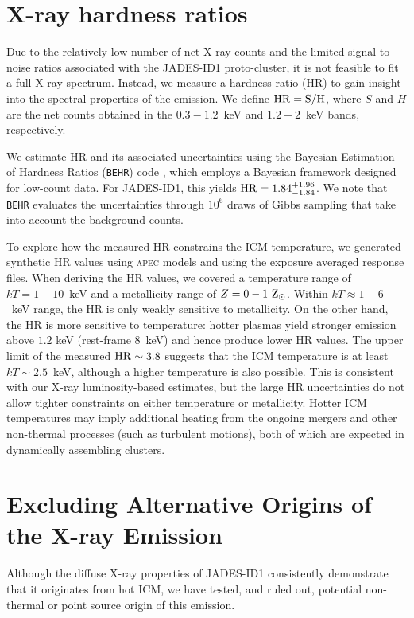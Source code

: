 \documentclass[pdflatex,sn-mathphys-num]{sn-jnl}
\theoremstyle{thmstyleone}
\theoremstyle{thmstyletwo}
\theoremstyle{thmstylethree}
\begin{document}
\section{X-ray hardness ratios}
\label{sec:hardness}

Due to the relatively low number of net X-ray counts and the limited signal-to-noise ratios associated with the JADES-ID1 proto-cluster, it is not feasible to fit a full X-ray spectrum. Instead, we measure a hardness ratio (HR) to gain insight into the spectral properties of the emission. We define $\rm{HR} = S/H$, where $S$ and $H$ are the net counts obtained in the $0.3-1.2$~keV and $1.2-2$~keV bands, respectively.

We estimate HR and its associated uncertainties using the Bayesian Estimation of Hardness Ratios (\texttt{BEHR}) code \cite{2006ApJ...652..610P}, which employs a Bayesian framework designed for low-count data. For JADES-ID1, this yields $\rm{HR}=1.84^{+1.96}_{-1.84}$. We note that \texttt{BEHR} evaluates the uncertainties through $10^6$ draws of Gibbs sampling that take into account the background counts.

To explore how the measured HR constrains the ICM temperature, we generated synthetic HR values using \textsc{apec} models and using the exposure averaged response files. When deriving the HR values, we covered a temperature range of $kT=1-10$~keV and a metallicity range of $Z=0-1 \ \rm{Z_{\odot}}$. Within $kT\approx1-6$~keV range, the HR is only weakly sensitive to metallicity. On the other hand, the HR is more sensitive to temperature: hotter plasmas yield stronger emission above $1.2$ keV (rest-frame $8$~keV) and hence produce lower HR values. The upper limit of the measured $\rm{HR}\sim3.8$ suggests that the ICM temperature is at least $kT\sim2.5$~keV, although a higher temperature is also possible. This is consistent with our X-ray luminosity-based estimates, but the large HR uncertainties do not allow tighter constraints on either temperature or metallicity. Hotter ICM temperatures may imply additional heating from the ongoing mergers and other non-thermal processes (such as turbulent motions), both of which are expected in dynamically assembling clusters.

\section{Excluding Alternative Origins of the X-ray Emission}
\label{sec:scenarios}

Although the diffuse X-ray properties of JADES-ID1 consistently demonstrate that it originates from hot ICM, we have tested, and ruled out, potential non-thermal or point source origin of this emission.
\end{document}
